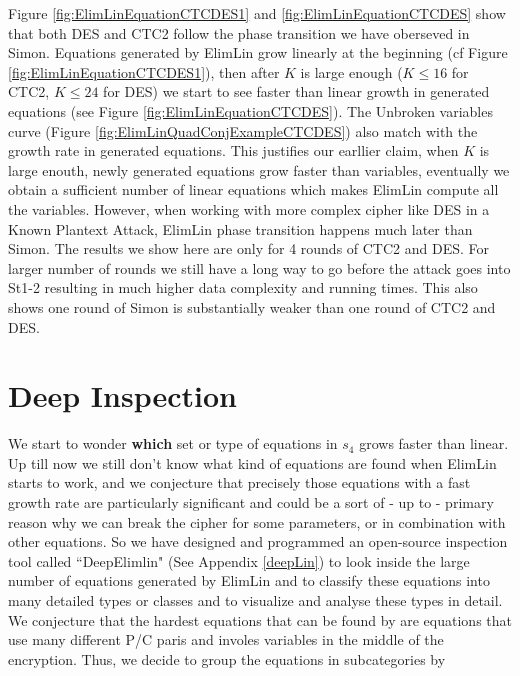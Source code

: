 Figure \ref{fig:ElimLinEquationCTCDES1} and \ref{fig:ElimLinEquationCTCDES} show that both DES and CTC2 follow the phase transition we have oberseved in Simon. Equations generated by ElimLin grow linearly at the beginning (cf Figure \ref{fig:ElimLinEquationCTCDES1}), then after $K$ is large enough ($K \leq 16$ for CTC2, $K \leq 24$ for DES) we start to see faster than linear growth in generated equations (see Figure \ref{fig:ElimLinEquationCTCDES}). The Unbroken variables curve (Figure \ref{fig:ElimLinQuadConjExampleCTCDES}) also match with the growth rate in generated equations. This justifies our earllier claim, when $K$ is large enouth, newly generated equations grow faster than variables, eventually we obtain a sufficient number of linear equations which makes ElimLin compute all the variables. However, when working with more complex cipher like DES in a Known Plantext Attack, ElimLin phase transition happens much later than Simon. The results we show here are only for 4 rounds of CTC2 and DES. For larger number of rounds we still have a long way to go before the attack goes into St1-2 resulting in much higher data complexity and running times. This also shows one round of Simon is substantially weaker than one round of CTC2 and DES. 


\section{Deep Inspection}
We start to wonder \textbf{which} set or type of equations in $s_4$ grows faster than linear. 
Up till now we still don't know what kind of equations are found when ElimLin starts to work, and we conjecture that precisely those equations with a fast growth rate are particularly significant and could be a sort of - up to - primary reason why we can break the cipher for some parameters, or in combination with other equations. 
So we have designed and programmed an open-source inspection tool called ``DeepElimlin" (See Appendix \ref{deepLin}) to look inside the large number of equations generated by ElimLin and to classify these equations into many detailed types or classes and to visualize and analyse these types in detail. We conjecture that the hardest equations that can be found by are equations that use many different P/C paris and involes variables in the middle of the encryption. Thus, we decide to group the equations in subcategories by 

